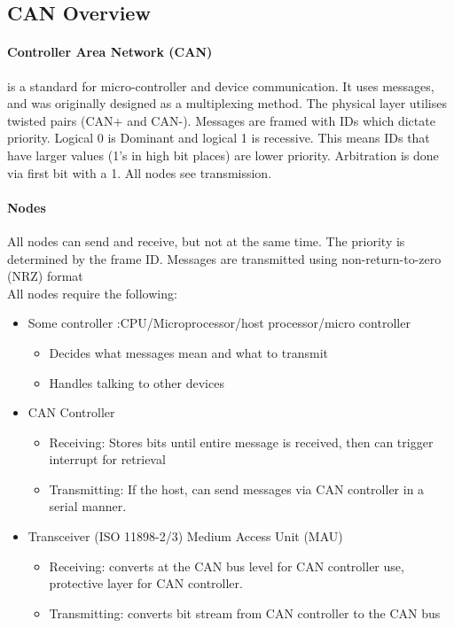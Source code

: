 
\subsection{CAN Overview}
\paragraph{Controller Area Network (CAN)} is a standard for micro-controller and device communication. It uses messages, and was originally designed as a multiplexing method. The physical layer utilises twisted pairs (CAN+ and CAN-). Messages are framed with IDs which dictate priority. Logical 0 is Dominant and logical 1 is recessive. This means IDs that have larger values (1's in high bit places) are lower priority. Arbitration is done via first bit with a 1. All nodes see transmission.
\paragraph{Nodes} All nodes can send and receive, but not at the same time. The priority is determined by the frame ID. Messages are transmitted using non-return-to-zero (NRZ) format \\ All nodes require the following: 
\begin{itemize}
    \item Some controller :CPU/Microprocessor/host processor/micro controller
        \begin{itemize}
            \item Decides what messages mean and what to transmit
            \item Handles talking to other devices
        \end{itemize}
    \item CAN Controller
        \begin{itemize}
            \item Receiving: Stores bits until entire message is received, then can trigger interrupt for retrieval
            \item Transmitting: If the host, can send messages via CAN controller in a serial manner.
        \end{itemize}
    \item Transceiver (ISO 11898-2/3) Medium Access Unit (MAU)
        \begin{itemize}
            \item Receiving: converts at the CAN bus level for CAN controller use, protective layer for CAN controller. 
            \item Transmitting: converts bit stream from CAN controller to the CAN bus
        \end{itemize}
\end{itemize}



